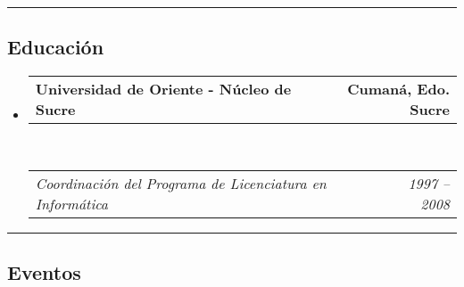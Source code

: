 \documentclass[10pt,letterpaper]{article}
\makeatletter
\newcommand{\headerrow}[2]
{\begin{tabular*}{\linewidth}{l@{\extracolsep{\fill}}r}
	#1 &
	#2 \\
\end{tabular*}}
\makeatother
\begin{document}
\hrule
\vspace{-0.4em}
\subsection*{Educación}

\begin{itemize}
	\parskip=0.1em

	\item 
	\headerrow
		{\textbf{Universidad de Oriente - Núcleo de Sucre}}
		{\textbf{Cumaná, Edo. Sucre}}
	\\
	\headerrow
		{\emph{Coordinación del Programa de Licenciatura en Informática}}
		{\emph{1997 -- 2008}}

\end{itemize}

\hrule
\vspace{-0.4em}
\subsection*{Eventos}
\end{document}
